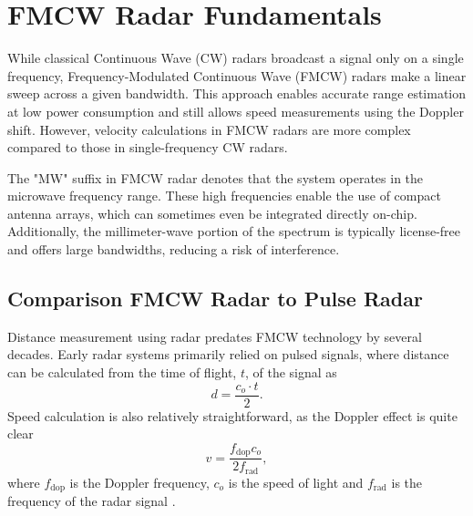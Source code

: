 \def\PageLayout{single-no-print}
\def\DocLanguage{en}
\def\PackagesIncludeTikz{yes}
\def\PackagesIncludeBib{yes}









\usepackage{pdfpages}

\newcommand{\sidar}{SiRad Easy\textsuperscript{\copyright} }
\newcommand{\boldred}[1]{\textbf{\textcolor{red}{#1}}}
\newcommand{\boldblue}[1]{\textbf{\textcolor{blue}{#1}}}






\tableofcontents

\newpage
{}
\setcounter{page}{1}





\pagestyle{fancy}

\chapter{FMCW Radar Fundamentals}

While classical Continuous Wave (CW) radars broadcast a signal only on a single frequency, Frequency-Modulated Continuous Wave (FMCW) radars make a linear sweep across a given bandwidth.
This approach enables accurate range estimation at low power consumption and still allows speed measurements using the Doppler shift.
However, velocity calculations in FMCW radars are more complex compared to those in single-frequency CW radars.

The "MW" suffix in FMCW radar denotes that the system operates in the microwave frequency range.
These high frequencies enable the use of compact antenna arrays, which can sometimes even be integrated directly on-chip.
Additionally, the millimeter-wave portion of the spectrum is typically license-free \cite{spektrumCTU} and offers large bandwidths, reducing a risk of interference.

\section{Comparison FMCW Radar to Pulse Radar}

Distance measurement using radar predates FMCW technology by several decades.
Early radar systems primarily relied on pulsed signals, where distance can be calculated from the time of flight, $t$, of the signal as
\begin{equation}
  d = \frac{c_o \cdot t}{2}.
  \label{eq:distance}
\end{equation}
Speed calculation is also relatively straightforward, as the Doppler effect is quite clear
\begin{equation}
  v = \frac{f_\mathrm{dop} c_o}{2f_\mathrm{rad}},
  \label{eq:dopler}
\end{equation}
where $f_\mathrm{dop}$ is the Doppler frequency, $c_o$ is the speed of light and $f_\mathrm{rad}$ is the frequency of the radar signal \cite{jankiraman2018}.

